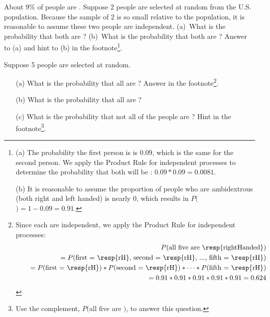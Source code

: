 \begin{exercise} \label{ex2Handedness}
About 9\% of people are . Suppose 2 people are selected at random from the U.S. population. Because the sample of 2 is so small relative to the population, it is reasonable to assume these two people are independent. (a)~What is the probability that both are ? (b)~What is the probability that both are ? Answer to (a) and hint to (b) in the footnote\footnote{(a) The probability the first person is  is $0.09$, which is the same for the second person. We apply the Product Rule for independent processes to determine the probability that both will be : $0.09*0.09 = 0.0081$.

(b) It is reasonable to assume the proportion of people who are ambidextrous (both right and left handed) is nearly 0, which results in $P($$)=1-0.09=0.91$.}.
\end{exercise}

\begin{exercise} \label{ex5Handedness}
Suppose 5 people are selected at random. \vspace{-1.5mm}
\begin{enumerate}
\item[(a)] What is the probability that all are ? Answer in the footnote\footnote{Since each are independent, we apply the Product Rule for independent processes:
\begin{eqnarray*}
&&P(\text{all five are \resp{rightHanded}}) \\
&&\quad = P(\text{first = \resp{rH}, second = \resp{rH}, ..., fifth = \resp{rH}}) \\
&&\quad = P(\text{first = \resp{rH}})*P(\text{second = \resp{rH}})* \dots *P(\text{fifth = \resp{rH}}) \\
&&\quad = 0.91*0.91*0.91*0.91*0.91 = 0.624
\end{eqnarray*}\vspace{-4mm}}.
\item[(b)] What is the probability that all are ?
\item[(c)] What is the probability that not all of the people are ? Hint in the footnote\footnote{Use the complement, $P($all five are $)$, to answer this question.}.
\end{enumerate}
\end{exercise}

